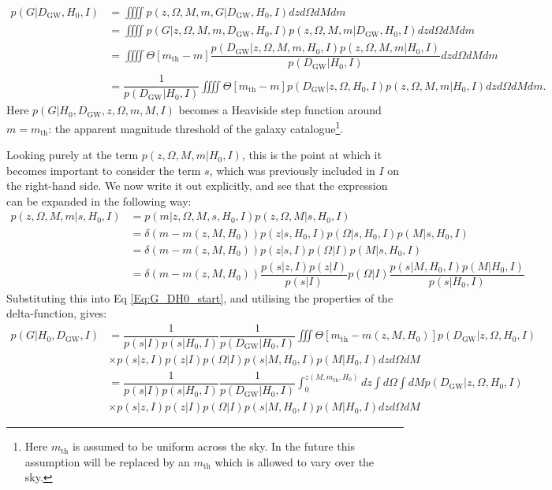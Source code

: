 \documentclass[a4paper,10pt]{article}
\begin{document}
\begin{equation}
\label{Eq:G_DH0_start}
\begin{aligned}
p(G|D_{\text{GW}},H_0,I) &= \iiiint p(z,\Omega,M,m,G|D_{\text{GW}},H_0,I) dz d\Omega dM dm
\\ &= \iiiint p(G|z,\Omega,M,m,D_{\text{GW}},H_0,I) p(z,\Omega,M,m|D_{\text{GW}},H_0,I) dz d\Omega dM dm
\\ &= \iiiint \Theta[m_{\text{th}}-m] \dfrac{p(D_{\text{GW}}|z,\Omega,M,m,H_0,I) p(z,\Omega,M,m|H_0,I)}{p(D_{\text{GW}}|H_0,I)}  dz d\Omega dM dm 
\\ &=  \dfrac{1}{p(D_{\text{GW}}|H_0,I)} \iiiint \Theta[m_{\text{th}}-m] p(D_{\text{GW}}|z,\Omega,H_0,I) p(z,\Omega,M,m|H_0,I) dz d\Omega dM dm.
\end{aligned}
\end{equation}
Here $p(G|H_0,D_{\text{GW}},z,\Omega,m,M,I)$ becomes a Heaviside step function around $m = m_{\text{th}}$: the apparent magnitude threshold of the galaxy catalogue\footnote{Here $m_{\text{th}}$ is assumed to be uniform across the sky.  In the future this assumption will be replaced by an $m_{\text{th}}$ which is allowed to vary over the sky.}.

Looking purely at the term $p(z,\Omega,M,m|H_0,I)$, this is the point at which it becomes important to consider the term $s$, which was previously included in $I$ on the right-hand side.  We now write it out explicitly, and see that the expression can be expanded in the following way:
\begin{equation}
\label{Eq:expand_prior}
\begin{aligned}
p(z,\Omega,M,m|s,H_0,I) &=  p(m|z,\Omega,M,s,H_0,I)p(z,\Omega,M|s,H_0,I)
\\ &= \delta(m - m(z,M,H_0))p(z|s,H_0,I)p(\Omega|s,H_0,I)p(M|s,H_0,I)
\\ &= \delta(m - m(z,M,H_0))p(z|s,I)p(\Omega|I)p(M|s,H_0,I)
\\ &= \delta(m - m(z,M,H_0))\dfrac{p(s|z,I)p(z|I)}{p(s|I)}p(\Omega|I)\dfrac{p(s|M,H_0,I)p(M|H_0,I)}{p(s|H_0,I)}
\end{aligned}
\end{equation}
Substituting this into Eq \ref{Eq:G_DH0_start}, and utilising the properties of the delta-function, gives:
\begin{equation}
\label{Eq:G_DH0_mid}
\begin{aligned}
p(G|H_0,D_{\text{GW}},I) &= \dfrac{1}{p(s|I)p(s|H_0,I)} \dfrac{1}{p(D_{\text{GW}}|H_0,I)} \iiint \Theta[m_{\text{th}}-m(z,M,H_0)] p(D_{\text{GW}}|z,\Omega,H_0,I) \\ &\times p(s|z,I) p(z|I)p(\Omega|I)p(s|M,H_0,I)p(M|H_0,I) dz d\Omega dM
\\&= \dfrac{1}{p(s|I)p(s|H_0,I)} \dfrac{1}{p(D_{\text{GW}}|H_0,I)} \int^{z(M,m_{\text{th}},H_0)}_0 dz \int d\Omega \int dM p(D_{\text{GW}}|z,\Omega,H_0,I) \\ &\times p(s|z,I) p(z|I)p(\Omega|I)p(s|M,H_0,I)p(M|H_0,I) dz d\Omega dM
\end{aligned}
\end{equation}
\end{document}
